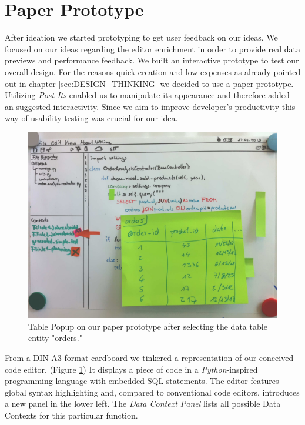 
\section[Paper Prototype (Author: Thomas B\"unger)]{Paper Prototype}
\label{sec:PAPER_PROTOTYPE}

After ideation we started prototyping to get user feedback on our ideas. 
We focused on our ideas regarding the editor enrichment in order to provide real data previews and performance feedback.
We built an interactive prototype to test our overall design. For the reasons quick creation and low expenses as already pointed out in chapter \ref{sec:DESIGN_THINKING} we decided to use a paper prototype. Utilizing \emph{Post-Its} enabled us to manipulate its appearance and therefore added an suggested interactivity.
Since we aim to improve developer's productivity this way of usability testing was crucial for our idea. \\


\begin{figure}
\begin{centering}
    \includegraphics[width=0.8\linewidth]{images/paper_prototype2}
    \caption{Table Popup on our paper prototype after selecting the data table entity "orders."}
    \label{fig:paper_prototype2}
\end{centering}
\end{figure}

From a DIN A3 format cardboard we tinkered a representation of our conceived code editor. (Figure \ref{fig:paper_prototype2})
It displays a piece of code in a \emph{Python}-inspired programming language with embedded SQL statements.
The editor features global syntax highlighting and, compared to conventional code editors, introduces a new panel in the lower left. The \emph{Data Context Panel} lists all possible Data Contexts for this particular function.\\

